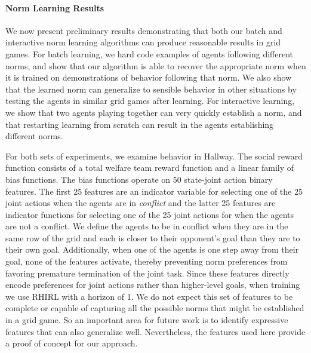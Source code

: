 
\paragraph{Norm Learning Results}
\label{sec:results}

We now present preliminary results demonstrating that both our batch
and interactive norm learning algorithms can produce reasonable
results in grid games. For batch learning, we hard code examples of
agents following different norms, and show that our algorithm is able
to recover the appropriate norm when it is trained on demonstrations
of behavior following that norm. We also show that the learned norm
can generalize to sensible behavior in other situations by testing the
agents in similar grid games after learning. For interactive learning,
we show that two agents playing together can very quickly 
establish a norm, and that restarting learning from scratch can result
in the agents establishing different norms.

For both sets of experiments, we examine behavior in Hallway.  The
social reward function consists of a total welfare team reward
function and a linear family of bias functions. The bias functions
operate on 50 state-joint action binary features. The first 25
features are an indicator variable for selecting one of the 25 joint
actions when the agents are in {\em conflict} and the latter 25
features are indicator functions for selecting one of the 25 joint
actions for when the agents are not a conflict. We define the agents
to be in conflict when they are in the same row of the grid and each
is closer to their opponent's goal than they are to their own
goal. Additionally, when one of the agents is one step away from their
goal, none of the features activate, thereby preventing norm
preferences from favoring premature termination of the joint
task. Since these features directly encode preferences for joint
actions rather than higher-level goals, when training we use RHIRL
with a horizon of 1. We do not expect this set of features to be
complete or capable of capturing all the possible norms that might be
established in a grid game. So an important area for future work is to
identify expressive features that can also generalize
well. Nevertheless, the features used here provide a proof of concept
for our approach.

